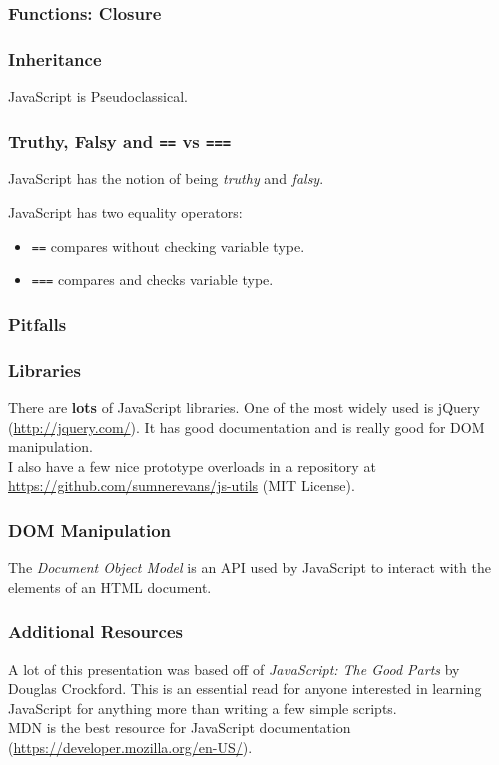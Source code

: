 \documentclass{lug}
\begin{document}
\begin{frame}
    \frametitle{Functions: Closure}

\end{frame}

\begin{frame}
    \frametitle{Inheritance}
    JavaScript is Pseudoclassical.

\end{frame}

\begin{frame}
    \frametitle{Truthy, Falsy and \texttt{==} vs \texttt{===}}

    JavaScript has the notion of being \textit{truthy} and \textit{falsy}.

    JavaScript has two equality operators:
    \begin{itemize}
        \item \texttt{==} compares without checking variable type.
        \item \texttt{===} compares and checks variable type.
    \end{itemize}
\end{frame}

\begin{frame}
    \frametitle{Pitfalls}

\end{frame}

\begin{frame}
    \frametitle{Libraries}

    There are \textbf{lots} of JavaScript libraries. One of the most widely used is jQuery
    (\url{http://jquery.com/}). It has good documentation and is really good for DOM
    manipulation.\\

    I also have a few nice prototype overloads in a repository at
    \url{https://github.com/sumnerevans/js-utils} (MIT License).

\end{frame}

\begin{frame}
    \frametitle{DOM Manipulation}

    The \textit{Document Object Model} is an API used by JavaScript to interact with the elements of
    an HTML document.\footnotemark[1]

\end{frame}

\begin{frame}
    \frametitle{Additional Resources}

    A lot of this presentation was based off of \textit{JavaScript: The Good Parts} by Douglas
    Crockford. This is an essential read for anyone interested in learning JavaScript for anything
    more than writing a few simple scripts.\\

    MDN is the best resource for JavaScript documentation
    (\url{https://developer.mozilla.org/en-US/}).
\end{frame}
\end{document}
